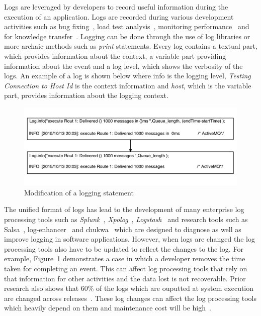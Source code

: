 

Logs are leveraged by developers to record useful information during the execution of an application. Logs are recorded during various development activities such as bug fixing~\cite{ConsoleLogs,JGLouMining,QFuanomaly}, load test analysis~\cite{Automatic}, monitoring performance~\cite{Yuan} and for knowledge transfer~\cite{IanWCRE}.
Logging can be done through the use of log libraries or more archaic methods such as \textsl{print} statements. Every log contains a textual part, which provides information about the context, a variable part providing information about the event and a log level, which shows the verbosity of the logs. An example of a log is shown below where info is the logging level, \textsl{Testing Connection to Host Id} is the context information and \textsl{host}, which is the variable part, provides information about the logging context.

\begin{figure}[tb]
	\centering
	\includegraphics[width=1\columnwidth]{ExampleOfLogChange_LPA}
	\caption{Modification of a logging statement}
	\label{fig:ExampleOfLogChange_LPA}
\end{figure}


The unified format of logs has lead to the development of many enterprise log processing tools such as \textsl{Splunk}~\cite{carasso2012exploring}, \textsl{Xpolog}~\cite{xpolog}, \textsl{Logstash}~\cite{xu2013detecting} and research tools such as Salsa~\cite{TanSalsa}, log-enhancer~\cite{Yuan} and chukwa~\cite{chukwa} which are designed to diagnose as well as improve logging in software applications. However, when logs are changed the log processing tools also have to be updated to reflect the changes to the log. For example, Figure~\ref{fig:ExampleOfLogChange_LPA} demonstrates a case in which a developer removes the time taken for completing an event. This can affect log processing tools that rely on that information for other activities and the data lost is not recoverable. Prior research also shows that 60\% of the logs which are ouputted at system execution are changed across releases~\cite{IanWCRE}. These log changes can affect the log processing tools which heavily depend on them and maintenance cost will be high~\cite{IanWCRE}. 

